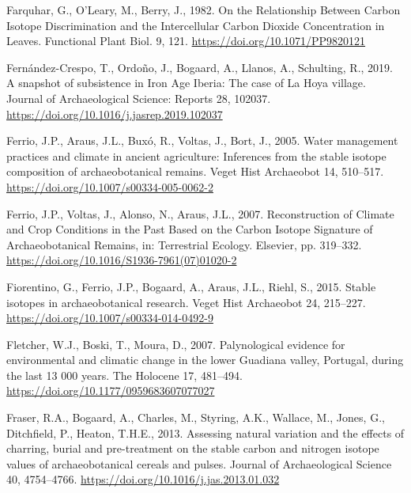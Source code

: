 \documentclass[3p]{elsarticle} %
\newlength{\cslhangindent}
\newlength{\cslentryspacingunit} %
\newenvironment{CSLReferences}[2] %
 {%
  \setlength{\parindent}{0pt}
  \ifodd #1
  \let\oldpar\par
  \def\par{\hangindent=\cslhangindent\oldpar}
  \fi
  \setlength{\parskip}{#2\cslentryspacingunit}
 }%
 {}
\begin{document}
\begin{CSLReferences}{1}{0}
\leavevmode{}%
Farquhar, G., O'Leary, M., Berry, J., 1982. On the {Relationship Between Carbon Isotope Discrimination} and the {Intercellular Carbon Dioxide Concentration} in {Leaves}. Functional Plant Biol. 9, 121. \url{https://doi.org/10.1071/PP9820121}

\leavevmode{}%
Fernández-Crespo, T., Ordoño, J., Bogaard, A., Llanos, A., Schulting, R., 2019. A snapshot of subsistence in {Iron Age Iberia}: {The} case of {La Hoya} village. Journal of Archaeological Science: Reports 28, 102037. \url{https://doi.org/10.1016/j.jasrep.2019.102037}

\leavevmode{}%
Ferrio, J.P., Araus, J.L., Buxó, R., Voltas, J., Bort, J., 2005. Water management practices and climate in ancient agriculture: Inferences from the stable isotope composition of archaeobotanical remains. Veget Hist Archaeobot 14, 510--517. \url{https://doi.org/10.1007/s00334-005-0062-2}

\leavevmode{}%
Ferrio, J.P., Voltas, J., Alonso, N., Araus, J.L., 2007. Reconstruction of {Climate} and {Crop Conditions} in the {Past Based} on the {Carbon Isotope Signature} of {Archaeobotanical Remains}, in: Terrestrial {Ecology}. {Elsevier}, pp. 319--332. \url{https://doi.org/10.1016/S1936-7961(07)01020-2}

\leavevmode{}%
Fiorentino, G., Ferrio, J.P., Bogaard, A., Araus, J.L., Riehl, S., 2015. Stable isotopes in archaeobotanical research. Veget Hist Archaeobot 24, 215--227. \url{https://doi.org/10.1007/s00334-014-0492-9}

\leavevmode{}%
Fletcher, W.J., Boski, T., Moura, D., 2007. Palynological evidence for environmental and climatic change in the lower {Guadiana} valley, {Portugal}, during the last 13 000 years. The Holocene 17, 481--494. \url{https://doi.org/10.1177/0959683607077027}

\leavevmode{}%
Fraser, R.A., Bogaard, A., Charles, M., Styring, A.K., Wallace, M., Jones, G., Ditchfield, P., Heaton, T.H.E., 2013. Assessing natural variation and the effects of charring, burial and pre-treatment on the stable carbon and nitrogen isotope values of archaeobotanical cereals and pulses. Journal of Archaeological Science 40, 4754--4766. \url{https://doi.org/10.1016/j.jas.2013.01.032}


\end{CSLReferences}
\end{document}
